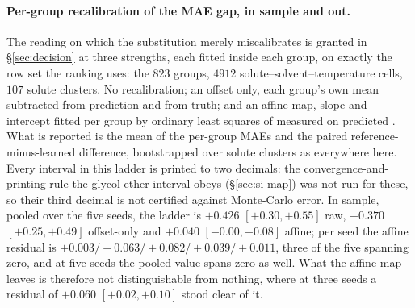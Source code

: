 \paragraph{Per-group recalibration of the MAE gap, in sample and out.} The reading on which the
substitution merely miscalibrates is granted in \S\ref{sec:decision} at three strengths, each fitted
inside each group, on exactly the row set the ranking uses: the $823$ groups, $4912$
solute--solvent--temperature cells, $107$ solute clusters. No recalibration; an offset only, each
group's own mean subtracted from prediction and from truth; and an affine map, slope and intercept
fitted per group by ordinary least squares of measured on predicted \lnx. What is reported is the
mean of the per-group MAEs and the paired reference-minus-learned difference, bootstrapped over
solute clusters as everywhere here. Every interval in this ladder is printed to two decimals: the
convergence-and-printing rule the glycol-ether interval obeys (\S\ref{sec:si-map}) was not run for
these, so their third decimal is not certified against Monte-Carlo error. In sample, pooled over the
five seeds, the ladder is $+0.426$
$[+0.30,+0.55]$ raw, $+0.370$ $[+0.25,+0.49]$ offset-only and $+0.040$ $[-0.00,+0.08]$ affine;
per seed the affine residual is $+0.003/{+}0.063/{+}0.082/{+}0.039/{+}0.011$, three of the five
spanning zero, and at five seeds the pooled value spans zero as well. What the affine map leaves is
therefore not distinguishable from nothing, where at three seeds a residual of $+0.060$
$[+0.02,+0.10]$ stood clear of it.

